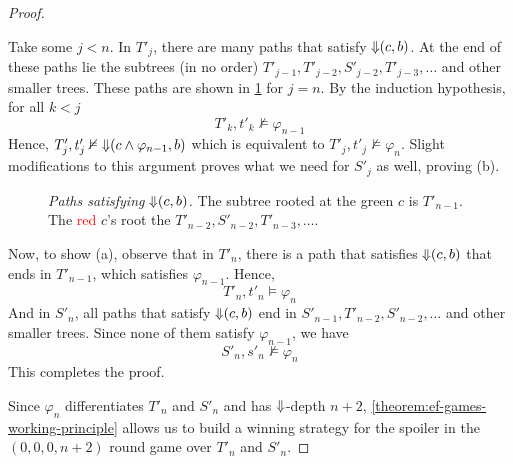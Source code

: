 \documentclass[a4paper,UKenglish,cleveref, autoref, thm-restate, numberwithinsect]{lipics-v2021}
\def\Darrow{\ensuremath\mathord{\Downarrow}}
\begin{document}
\begin{proof}
\begin{claimproof}
\begin{description}
                Take some $j < n$. In $T'_j$, there are many paths that satisfy $\Darrow(c, b)$. At the end of these paths lie the subtrees (in no order) $T'_{j-1}, T'_{j - 2}, S'_{j - 2}, T'_{j - 3}, \ldots$ and other smaller trees. These paths are shown in \cref{efFinalProofStep1} for $j = n$. By the induction hypothesis, for all $k < j$
                \begin{equation*}
                        T'_k, t'_k \nvDash \varphi_{n - 1}
                \end{equation*}
                Hence, $T'_j, t'_j \nvDash \Darrow(c \land \varphi_{n - 1}, b)$ which is equivalent to  $T'_j, t'_j \nvDash \varphi_n$. Slight modifications to this argument proves what we need for $S'_j$ as well, proving (b).
                \begin{figure}[h]
                    \centering
                    \caption{\emph{Paths satisfying $\Darrow(c, b)$.} The subtree rooted at the \textcolor{OliveGreen}{green} $c$ is $T'_{n - 1}$. The \textcolor{red}{red} $c$'s root the $T'_{n - 2}, S'_{n - 2}, T'_{n-3}, \ldots$.}
                    \label{efFinalProofStep1}
                \end{figure}

                Now, to show (a), observe that in $T'_n$, there is a path that satisfies $\Darrow(c, b)$ that ends in $T'_{n - 1}$, which satisfies $\varphi_{n-1}$. Hence,
                \begin{equation*}
                    T'_n, t'_n \vDash \varphi_n
                \end{equation*}
                And in $S'_n$, all paths that satisfy $\Darrow(c, b)$ end in $S'_{n - 1}, T'_{n -2}, S'_{n - 2}, \ldots$ and other smaller trees. Since none of them satisfy $\varphi_{n-1}$, we have
                \begin{equation*}
                    S'_n, s'_n \nvDash \varphi_n
                \end{equation*}
                This completes the proof.
        \end{description}
    \end{claimproof}
    Since $\varphi_n$ differentiates $T'_n$ and $S'_n$ and has $\Darrow$-depth $n+2$, \cref{theorem:ef-games-working-principle} allows us to build a winning strategy for the spoiler in the $(0, 0, 0, n+2)$ round game over $T'_n$ and $S'_n$.


\end{proof}
\end{document}
